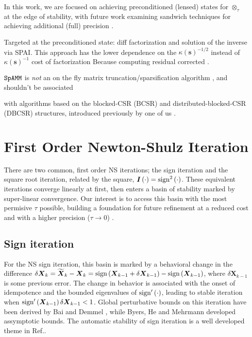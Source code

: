 \documentclass[letterpaper,twocolumn,amsmath,amsfont,amssymb,english,aps,jcp,preprintnumbers,groupaddress,nofootinbib,tightenlines]{revtex4}
\newcommand{\mat}[1]{\boldsymbol{#1}}
\newcommand{\ot}{ {\scriptstyle \otimes}_{ \tau } }
\begin{document}
In this work, we are focused on achieving preconditioned (lensed) states for $\ot$ at the edge of stability,  
with future work examining sandwich techniques for achieving additional (full) precision \cite{}.  

Targeted at the preconditioned state: diff factorization and solution of the inverse via SPAI. This
approach has the lower dependence on the $\kappa(\mat{s})^{-1/2}$ instead of $\kappa(\mat{s})^{-1}$
cost of factorization  Because computing residual corrected . 

$\tt SpAMM$ is {\em not} an on the fly matrix truncation/sparsification algorithm \cite{}, and shouldn't be associated


with algorithms based on the blocked-CSR (BCSR) and distributed-blocked-CSR (DBCSR) structures, 
introduced previously by one of us \cite{}. 








\pagebreak

\section{First Order Newton-Shulz Iteration}

There are two common, first order NS iterations; the sign iteration and the square root iteration, related by the square, $\mat{I}\left( \cdot \right)= {\rm sign}^2\left( \cdot \right) $.  These equivalent iterations converge linearly at first, then enters a basin of stability marked by super-linear convergence. 
Our interest is to access this basin with the most permisive $\tau$ possible, building a foundation for future refinement
at a reduced cost and with a higher precision ($\tau \rightarrow 0$) \cite{MChallacombe16}.

\subsection{Sign iteration}
For the NS sign iteration, this basin is marked by a behavioral change in the
difference $\delta \mat{X}_k = \widetilde{\mat{X}}_k -\mat{X}_k = {\rm sign} \left(\mat{X}_{k-1}+\delta \mat{X}_{k-1} \right)
-{\rm sign} \left(\mat{X}_{k-1} \right)$, where $\delta \mat{X}_{k-1}$ is some previous error.
The change in behavior is associated with the onset of idempotence and the bounded eigenvalues of ${\rm sign}'\left( \cdot \right)$, leading to stable 
iteration when ${\rm sign}'\left( \mat{X}_{k-1} \right) \delta \mat{X}_{k-1} < 1 $.  
Global perturbative bounds on this iteration have been derived by Bai and Demmel \cite{Bai98usingthe}, while
Byers, He and Mehrmann \cite{} developed assymptotic bounds.  The automatic stability of sign iteration is a well developed theme in Ref.\cite{Higham08}.
\end{document}
